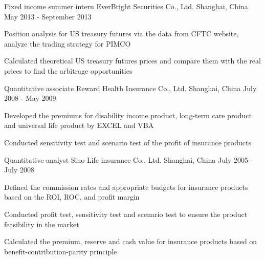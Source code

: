 \begin{cventries}
  \cventry
    {Fixed income summer intern}
    {EverBright Securities Co., Ltd.}
    {Shanghai, China}
    {May 2013 - September 2013}
    {
      \begin{cvitems}
        \item {Position analysis for US treasury futures via the data from CFTC website, analyze the trading strategy for PIMCO
        }
        \item {Calculated theoretical US treasury futures prices and compare them with the real prices to find the arbitrage opportunities}
      \end{cvitems}
    }
  \cventry
    {Quantitative associate}
    {Reward Health Insurance Co., Ltd.}
    {Shanghai, China}
    {July 2008 - May 2009}
    {
      \begin{cvitems}
        \item {Developed the premiums for disability income product, long-term care product and universal life product by EXCEL and
        VBA}
        \item {Conducted sensitivity test and scenario test of the profit of insurance products}
      \end{cvitems}
    }
    
 \cventry
    {Quantitative analyst}
    {Sino-Life insurance Co., Ltd.}
    {Shanghai, China}
    {July 2005 - July 2008}
    {
      \begin{cvitems}
        \item {Defined the commission rates and appropriate budgets for insurance products based on the ROI, ROC, and profit margin}
        \item{
        Conducted profit test, sensitivity test and scenario test to ensure the product feasibility in the market}
        \item{Calculated the
                premium, reserve and cash value for insurance products based on benefit-contribution-parity principle}
      \end{cvitems}
    }    
\end{cventries}
